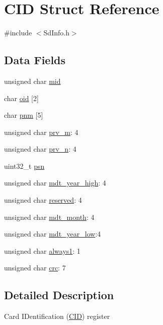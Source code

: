 \hypertarget{struct_c_i_d}{\section{C\-I\-D Struct Reference}
\label{struct_c_i_d}
}


{\ttfamily \#include $<$Sd\-Info.\-h$>$}

\subsection*{Data Fields}
\begin{DoxyCompactItemize}
\item 
unsigned char \hyperlink{struct_c_i_d_ae7e18f9a317db7063e35ef5a5d4bd5f7}{mid}
\item 
char \hyperlink{struct_c_i_d_a0e7c3c74464b5888d6e4dde057c4d2c9}{oid} \mbox{[}2\mbox{]}
\item 
char \hyperlink{struct_c_i_d_a44c58f891140614a2a6a1ad573ca0bf3}{pnm} \mbox{[}5\mbox{]}
\item 
unsigned char \hyperlink{struct_c_i_d_a4db87c2ec4c352612dcf8cedf9986d8e}{prv\-\_\-m}\-: 4
\item 
unsigned char \hyperlink{struct_c_i_d_a1cb6a1abc2649d20b1f2e57dd1763997}{prv\-\_\-n}\-: 4
\item 
uint32\-\_\-t \hyperlink{struct_c_i_d_ab39d64e654c57f0bc30ce636e071713a}{psn}
\item 
unsigned char \hyperlink{struct_c_i_d_a5e4772a445bb5e242f62d89ed9fa01bb}{mdt\-\_\-year\-\_\-high}\-: 4
\item 
unsigned char \hyperlink{struct_c_i_d_ad828f5fe7507f2e5a9df0da7a74b59e8}{reserved}\-: 4
\item 
unsigned char \hyperlink{struct_c_i_d_a6f31f0414d7c277a8f3ac4a8e7a83101}{mdt\-\_\-month}\-: 4
\item 
unsigned char \hyperlink{struct_c_i_d_aaf6f6e0f7e73844d7d2a59b3e7f3b6de}{mdt\-\_\-year\-\_\-low}\-:4
\item 
unsigned char \hyperlink{struct_c_i_d_af3bbe76c61e108c500f5a861dff1e6c2}{always1}\-: 1
\item 
unsigned char \hyperlink{struct_c_i_d_aa7963a1d695d609cf3609747cf19fd71}{crc}\-: 7
\end{DoxyCompactItemize}


\subsection{Detailed Description}
Card I\-Dentification (\hyperlink{struct_c_i_d}{C\-I\-D}) register 

